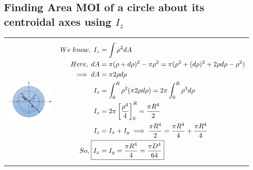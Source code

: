 \documentclass[8pt]{report}
\begin{document}
	\subsection{Finding Area MOI of a circle about its centroidal axes using $I_z$}
		\begin{table}[H]
		\centering
		\begin{tabular}{cc}
			\parbox{5cm}{\includegraphics[scale=0.5]{circleMOI.png}} 
			& \parbox{7cm}{
			\begin{align*}
				We\;know,\;I_z&=\int\rho^2dA\\
			Here,\;dA&=\pi(\rho+d\rho)^2-\pi\rho^2 = \pi(\rho^2+(d\rho)^2+2\rho d\rho-\rho^2)\\
			\implies dA &= \pi 2\rho d\rho\\
			I_z &= \int_0^R\rho^2(\pi 2\rho d\rho) = 2\pi\int_0^R\rho^3d\rho\\
			I_z &= 2\pi\left[\dfrac{\rho^4}{4}\right]_0^R = \dfrac{\pi R^4}{2}\\
			I_z &= I_x + I_y \implies  \dfrac{\pi R^4}{2} =  \dfrac{\pi R^4}{4} +  \dfrac{\pi R^4}{4}\\
			So,\;\Aboxed{I_x &= I_y =  \dfrac{\pi R^4}{4} =  \dfrac{\pi D^4}{64}}
			\end{align*}}
		\end{tabular}
	\end{table}\hrulefill
\end{document}
